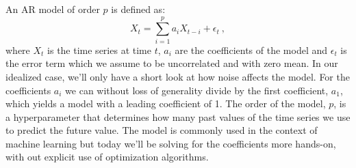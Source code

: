 \documentclass[10pt, titlepage, a4paper]{article}
\begin{document}
An AR model of order $p$ is defined as:
%
\begin{equation}
    X_t = \sum_{i=1}^p a_i X_{t-i} + \epsilon_t\>,
\end{equation}
%
where $X_t$ is the time series at time $t$, $a_i$ are the coefficients of the model and $\epsilon_t$ is the error term which 
we assume to be uncorrelated and with zero mean. In our idealized case, we'll only have a short look at how noise 
affects the model. For the coefficients $a_i$ we can without loss of generality divide by the first coefficient, $a_1$,
which yields a model with a leading coefficient of 1. The order of the model, $p$, is a hyperparameter that determines 
how many past values of the time series we use to predict the future value. The model is commonly used in the context of 
machine learning but today we'll be solving for the coefficients more hands-on, with out explicit use of optimization 
algorithms. \\
\end{document}
